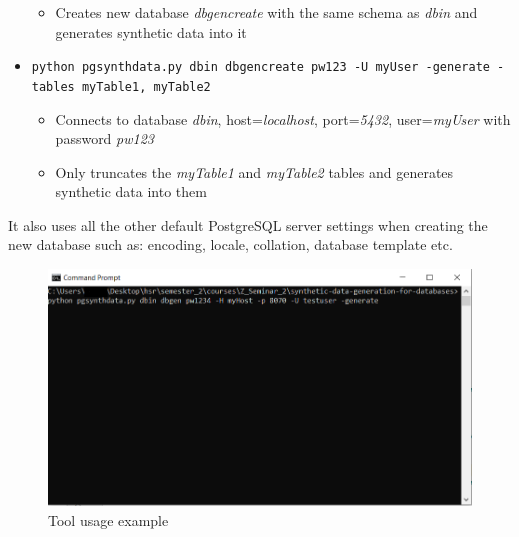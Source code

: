 \begin{itemize}
\begin{itemize}
		\item Creates new database \textit{dbgencreate} with the same schema as \textit{dbin} and generates synthetic data into it
	\end{itemize}
	\item \texttt{python pgsynthdata.py dbin dbgencreate pw123 -U myUser -generate -tables myTable1, myTable2}
	\begin{itemize}
		\item Connects to database \textit{dbin}, host=\textit{localhost}, port=\textit{5432}, user=\textit{myUser} with password \textit{pw123}
		\item Only truncates the \textit{myTable1} and \textit{myTable2} tables and generates synthetic data into them
	\end{itemize}
\end{itemize}
\newpage
It also uses all the other default PostgreSQL server settings when creating the new database such as: encoding, locale, collation, database template etc.
\begin{figure}[H]
	\includegraphics[width=\linewidth]{./Figures/Implementation/tool_example_cmd.png}
	\caption{Tool usage example}
\end{figure}
